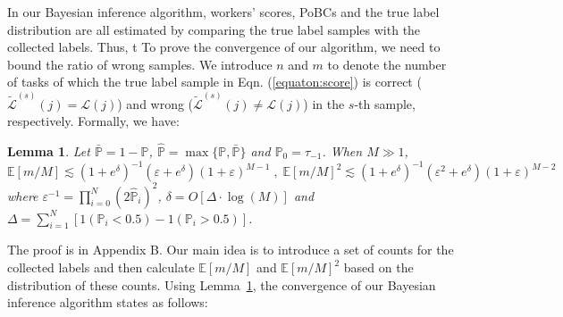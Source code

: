 \documentclass{article}
\newcounter{lemmas}
\newtheorem{lemma}[lemmas]{Lemma}
\begin{document}
In our Bayesian inference algorithm, workers' scores, PoBCs and the true label distribution are all estimated by comparing the true label samples with the collected labels. %
Thus, t
To prove the convergence of our algorithm, we need to bound the ratio of wrong samples.
We introduce $n$ and $m$ to denote the number of tasks of which the true label sample in Eqn. (\ref{equaton:score}) is correct ($\tilde{\mathcal{L}}^{(s)}(j)=\mathcal{L}(j)$) and wrong ($\tilde{\mathcal{L}}^{(s)}(j)\neq \mathcal{L}(j)$) in the $s$-th sample, respectively.
Formally, we have: %
\begin{lemma}
\label{ConvBound}
Let $\bar{\mathbb{P}}=1-\mathbb{P}$, $\hat{\mathbb{P}}=\max \{\mathbb{P}, \bar{\mathbb{P}}\}$ and $\mathbb{P}_0=\tau_{-1}$. When $M\gg 1$,
\begin{equation}
\label{equation:CB}
\mathbb{E}[m/M]\lesssim (1+e^{\delta})^{-1}(\varepsilon+e^{\delta})(1+\varepsilon)^{M-1}\;,\;
\mathbb{E}[m/M]^2\lesssim (1+e^{\delta})^{-1}(\varepsilon^2+e^{\delta})(1+\varepsilon)^{M-2}
\end{equation}
where $\varepsilon^{-1}=\prod_{i=0}^{N}(2\hat{\mathbb{P}}_i)^{2}$, $\delta=O[\Delta\cdot \log(M)]$ and 
$\Delta={\sum}_{i=1}^N[1(\mathbb{P}_i<0.5)-1(\mathbb{P}_i>0.5)]$.
\end{lemma}
The proof is in Appendix B. Our main idea is to introduce a set of counts for the collected labels and then calculate $\mathbb{E}[m/M]$ and $\mathbb{E}[m/M]^2$ based on the distribution of these counts. Using Lemma~\ref{ConvBound}, the convergence of our Bayesian inference algorithm states as follows:

\end{document}
